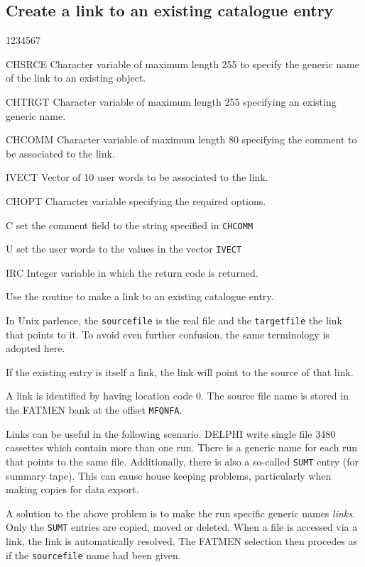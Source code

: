 \subsection{Create a link to an existing catalogue entry}
\begin{DLtt}{1234567}
\item[CHSRCE]
Character variable of maximum length 255 to specify the generic name of
the link to an existing object.
\item[CHTRGT]
Character variable of maximum length 255 specifying an existing generic name.
\item[CHCOMM]
Character variable of maximum length 80 specifying the comment to 
be associated to the link. 
\item[IVECT]
Vector of 10 user words to be associated to the link.
\item[CHOPT]
Character variable specifying the required options.
\begin{DLtt}{12}
\item[C]set the comment field to the string specified in {\tt CHCOMM}
\item[U]set the user words to the values in the vector {\tt IVECT}
\end{DLtt}
\item[IRC]
Integer variable in which the return code is returned.
\end{DLtt}
Use the  routine to make a link to an existing catalogue entry.

In Unix parlence, the {\tt sourcefile} is the real file and the
{\tt targetfile} the link that points to it. To avoid even further
confusion, the same terminology is adopted here.

If the existing entry is itself a link, the link will point to the
source of that link.

A link is identified by having location code 0. The source file name
is stored in the FATMEN bank at the offset {\tt MFQNFA}.

Links can be useful in the following scenario. DELPHI write single
file 3480 cassettes which contain more than one run. There is a generic name
for each run that points to the same file. Additionally, there is also
a so-called {\tt SUMT} entry (for summary tape). This
can cause house keeping problems, particularly when making copies
for data export.

A solution to the above problem is to make the run specific generic
names {\it links}. Only the {\tt SUMT} entries are copied, moved or
deleted. When a file is accessed via a link, the link is automatically
resolved. The FATMEN selection then procedes as if the {\tt sourcefile}
name had been given.

